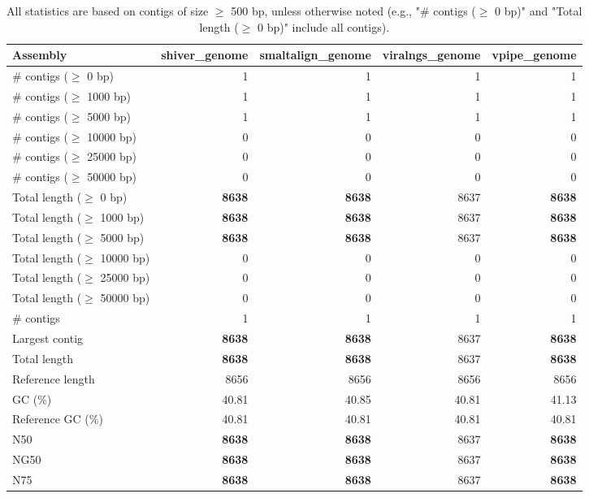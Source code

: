 \documentclass[12pt,a4paper]{article}
\begin{document}
\begin{table}[ht]
\begin{center}
\caption{All statistics are based on contigs of size $\geq$ 500 bp, unless otherwise noted (e.g., "\# contigs ($\geq$ 0 bp)" and "Total length ($\geq$ 0 bp)" include all contigs).}
\begin{tabular}{|l*{4}{|r}|}
\hline
Assembly & shiver\_genome & smaltalign\_genome & viralngs\_genome & vpipe\_genome \\ \hline
\# contigs ($\geq$ 0 bp) & 1 & 1 & 1 & 1 \\ \hline
\# contigs ($\geq$ 1000 bp) & 1 & 1 & 1 & 1 \\ \hline
\# contigs ($\geq$ 5000 bp) & 1 & 1 & 1 & 1 \\ \hline
\# contigs ($\geq$ 10000 bp) & 0 & 0 & 0 & 0 \\ \hline
\# contigs ($\geq$ 25000 bp) & 0 & 0 & 0 & 0 \\ \hline
\# contigs ($\geq$ 50000 bp) & 0 & 0 & 0 & 0 \\ \hline
Total length ($\geq$ 0 bp) & {\bf 8638} & {\bf 8638} & 8637 & {\bf 8638} \\ \hline
Total length ($\geq$ 1000 bp) & {\bf 8638} & {\bf 8638} & 8637 & {\bf 8638} \\ \hline
Total length ($\geq$ 5000 bp) & {\bf 8638} & {\bf 8638} & 8637 & {\bf 8638} \\ \hline
Total length ($\geq$ 10000 bp) & 0 & 0 & 0 & 0 \\ \hline
Total length ($\geq$ 25000 bp) & 0 & 0 & 0 & 0 \\ \hline
Total length ($\geq$ 50000 bp) & 0 & 0 & 0 & 0 \\ \hline
\# contigs & 1 & 1 & 1 & 1 \\ \hline
Largest contig & {\bf 8638} & {\bf 8638} & 8637 & {\bf 8638} \\ \hline
Total length & {\bf 8638} & {\bf 8638} & 8637 & {\bf 8638} \\ \hline
Reference length & 8656 & 8656 & 8656 & 8656 \\ \hline
GC (\%) & 40.81 & 40.85 & 40.81 & 41.13 \\ \hline
Reference GC (\%) & 40.81 & 40.81 & 40.81 & 40.81 \\ \hline
N50 & {\bf 8638} & {\bf 8638} & 8637 & {\bf 8638} \\ \hline
NG50 & {\bf 8638} & {\bf 8638} & 8637 & {\bf 8638} \\ \hline
N75 & {\bf 8638} & {\bf 8638} & 8637 & {\bf 8638} \\ \hline

\end{tabular}
\end{center}
\end{table}
\end{document}
